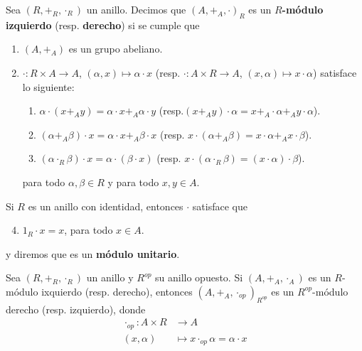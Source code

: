 \documentclass[12pt]{report}
\newcounter{it}
\theoremstyle{largebreak}
\newcommand\cf[3]{\ensuremath{#1:#2\rightarrow#3}}
\begin{document}
    \begin{mydef}
        Sea $(R,+_R,\cdot_R)$ un anillo. Decimos que $(A,+_A,\cdot)_R$ es un \textbf{$R$-módulo izquierdo} (resp. \textbf{derecho}) si se cumple que
        \begin{enumerate}
            \item $(A,+_A)$ es un grupo abeliano.
            \item $\cf{\cdot}{R\times A}{A}$, $(\alpha,x)\mapsto \alpha\cdot x$ (resp. $\cf{\cdot}{A\times R}{A}$, $(x,\alpha)\mapsto x\cdot\alpha$) satisface lo siguiente:
            \begin{enumerate}
                \item $\alpha\cdot(x+_A y)=\alpha\cdot x+_A \alpha\cdot y$ (resp.$(x+_A y)\cdot\alpha=x+_A\cdot\alpha+_A y\cdot\alpha$).
                \item $(\alpha+_A\beta)\cdot x=\alpha\cdot x+_A\beta\cdot x$ (resp. $x\cdot(\alpha+_A\beta)=x\cdot\alpha+_A x\cdot\beta$).
                \item $(\alpha\cdot_R\beta)\cdot x=\alpha\cdot(\beta\cdot x)$ (resp. $x\cdot(\alpha\cdot_R\beta)=(x\cdot\alpha)\cdot\beta$).
            \end{enumerate}
            para todo $\alpha,\beta\in R$ y para todo $x,y\in A$. 
        \end{enumerate}
        Si $R$ es un anillo con identidad, entonces $\cdot$ satisface que
        \renewcommand{\theenumi}{\roman{enumi}}
        \begin{enumerate}
            \setcounter{enumi}{3}
            \item $1_R\cdot x=x$, para todo $x\in A$.
        \end{enumerate}
        y diremos que es un \textbf{módulo unitario}.
    \end{mydef}

    \begin{lema}
        Sea $(R,+_R,\cdot_R)$ un anillo y $R^{op}$ su anillo opuesto. Si $(A,+_A,\cdot_A)$ es un $R$-módulo ixquierdo (resp. derecho), entonces $(A,+_A,\cdot_{op})_{R^{op}}$ es un $R^{op}$-módulo derecho (resp. izquierdo), donde
        \begin{equation*}
            \begin{split}
                \cdot_{op}:A\times R&\rightarrow A\\
                (x,\alpha)&\mapsto x\cdot_{op}\alpha=\alpha\cdot x 
            \end{split}
        \end{equation*}
    \end{lema}
\end{document}
